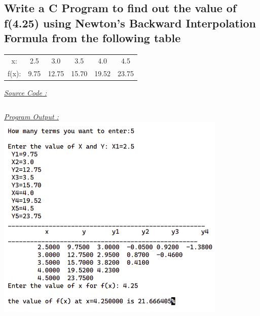 \documentclass{article}
\begin{document}
\subsection{Write a C Program to find out the value of f(4.25) using Newton's Backward Interpolation Formula from the following table}
\begin{center}
\begin{tabular}{c|c|c|c|c|c}
  x: & 2.5 & 3.0 & 3.5 & 4.0 & 4.5 \\
  f(x): & 9.75 & 12.75 & 15.70 & 19.52 & 23.75
\end{tabular}
\end{center}
\bigbreak
\underline{\emph{\Large Source Code :}}
\inputminted[breaklines,tabsize=2]{c}{2.c}
\bigbreak
\noindent
\newpage
\underline{\emph{\Large Program Output :}}
\bigbreak
\noindent
\includegraphics[width=110mm,scale=0.5]{outputs/2}
\end{document}
